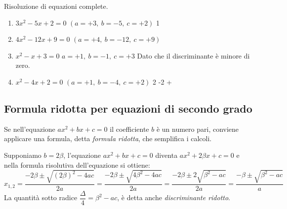 \begin{esempio}
Risoluzione di equazioni complete.
\begin{enumerate}
\item \(3x^2 -5x +2 = 0\) \quad \((a = +3,~b = -5,~c = +2)\) 
      {}{1}
\item \(4x^2 -12x +9 = 0\) \((a = +4,~b = -12,~c = +9)\)
            {}
\item \(x^2 -x +3=0\) \quad \(a = +1,~b = -1,~c = +3\)
            {}
Dato che il discriminante è minore di zero.
\item \(x^2 -4x +2 = 0\) \quad \((a = +1,~b = -4,~c = +2)\) 
      {2 -}{2 +}
\end{enumerate}
\end{esempio}



\subsection{Formula ridotta per equazioni di secondo grado}
Se nell'equazione
\(a x^2 +b x +c=0\) il coefficiente \(b\) è un numero pari, conviene 
applicare una formula, detta \emph{formula ridotta}, che semplifica i 
calcoli.

Supponiamo \(b=2 \beta\), l'equazione \(a x^2 +b x +c=0\) diventa 
\(a x^2 +2 \beta x +c=0\) 
e nella formula risolutiva dell'equazione si ottiene:
\[x_{1,2}=\dfrac{-2 \beta \pm \sqrt{( 2 \beta )^2 -4ac}}{2a}=
\dfrac{-2 \beta \pm \sqrt{4\beta^{2} -4ac}}{2a}=
\dfrac{-2 \beta \pm 2 \sqrt{\beta^{2} -ac}}{2 a}=
\dfrac{-\beta \pm \sqrt{\beta^2 -ac}}{a}\]
La quantità sotto radice 
\(\dfrac{\Delta}{4} = \beta^{2} -a c\), 
è detta anche \emph{discriminante ridotto}.


